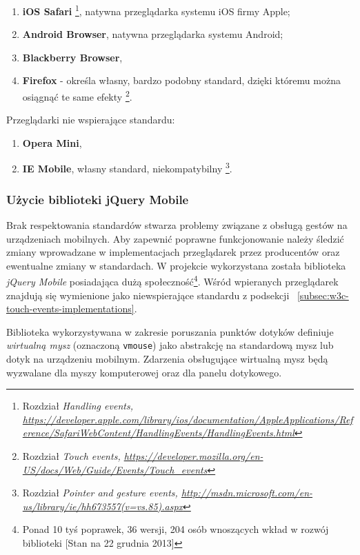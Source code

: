 \begin{enumerate}
  \item \textbf{iOS Safari}\cite{browser-ios-safari} \footnote{\cite{browser-ios-safari} Rozdział \em{Handling events}, \url{https://developer.apple.com/library/ios/documentation/AppleApplications/Reference/SafariWebContent/HandlingEvents/HandlingEvents.html}}, natywna przeglądarka systemu iOS firmy Apple;
  \item \textbf{Android Browser}, natywna przeglądarka systemu Android;
  \item \textbf{Blackberry Browser},
  \item \textbf{Firefox} - określa własny, bardzo podobny standard, dzięki któremu można osiągnąć te same efekty\cite{browser-firefox} \footnote{\cite{browser-firefox} Rozdział \em{Touch events}, \url{https://developer.mozilla.org/en-US/docs/Web/Guide/Events/Touch_events}}.
\end{enumerate}

Przeglądarki nie wspierające standardu:

\begin{enumerate}
  \item \textbf{Opera Mini},
  \item \textbf{IE Mobile}, własny standard, niekompatybilny\cite{browser-ie} \footnote{\cite{browser-ie} Rozdział \em{Pointer and gesture events}, \url{http://msdn.microsoft.com/en-us/library/ie/hh673557(v=vs.85).aspx}}.
\end{enumerate}

\subsubsection{Użycie biblioteki jQuery Mobile}

Brak respektowania standardów stwarza problemy związane z obsługą gestów na urządzeniach mobilnych. Aby zapewnić poprawne funkcjonowanie należy śledzić zmiany wprowadzane w implementacjach przeglądarek przez producentów oraz ewentualne zmiany w standardach. W projekcie wykorzystana została biblioteka \emph{jQuery Mobile} posiadająca dużą społeczność\footnote{Ponad 10 tyś poprawek, 36 wersji, 204 osób wnoszących wkład w rozwój biblioteki [Stan na 22 grudnia 2013]}. Wśród wpieranych przeglądarek znajdują się wymienione jako niewspierające standardu z podsekcji ~\ref{subsec:w3c-touch-events-implementations}.

Biblioteka wykorzystywana w zakresie poruszania punktów dotyków definiuje \emph{wirtualną mysz} (oznaczoną \lstinline{vmouse}) jako abstrakcję na standardową mysz lub dotyk na urządzeniu mobilnym. Zdarzenia obsługujące wirtualną mysz będą wyzwalane dla myszy komputerowej oraz dla panelu dotykowego.

